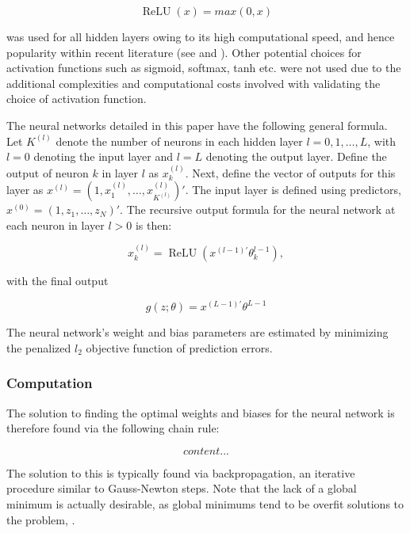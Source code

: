 \documentclass[a4paper]{article}
\begin{document}
\begin{equation}
	\operatorname{ReLU}(x) = max(0, x)
\end{equation}

was used for all hidden layers owing to its high computational speed, and hence popularity within recent literature  (see \cite{lecun_deep_2015} and \cite{ramachandran_searching_2017}). Other potential choices for activation functions such as sigmoid, softmax, tanh etc. were not used due to the additional complexities and computational costs involved with validating the choice of activation function.

The neural networks detailed in this paper have the following general formula. Let $K^{(l)}$ denote the number of neurons in each hidden layer $l = 0, 1, \dots, L$, with $l = 0$ denoting the input layer and $l = L$ denoting the output layer. Define the output of neuron $k$ in layer $l$ as $x_k^{(l)}$. Next, define the vector of outputs for this layer as $x^{(l)} = (1, x_1^{(l)}, \dots, x_{K^(l)}^{(l)})'$. The input layer is defined using predictors, $x^{(0)} = (1, z_1, \dots, z_N)'$. The recursive output formula for the neural network at each neuron in layer $l > 0$ is then:

\begin{equation}
	x_k^{(l)} = \operatorname{ReLU}(x^{(l-1)'}\theta_k^{l-1}),
\end{equation}

with the final output

\begin{equation}
	g(z;\theta) = x^{(L-1)'}\theta^{L-1}
\end{equation}

The neural network's weight and bias parameters are estimated by minimizing the penalized $l_2$ objective function of prediction errors.

\subsubsection{Computation}



The solution to finding the optimal weights and biases for the neural network is therefore found via the following chain rule:

\begin{equation}
	content...
\end{equation}

The solution to this is typically found via backpropagation, an iterative procedure similar to Gauss-Newton steps. Note that the lack of a global minimum is actually desirable, as global minimums tend to be overfit solutions to the problem, \citep{choromanska_loss_2014}.
\end{document}
